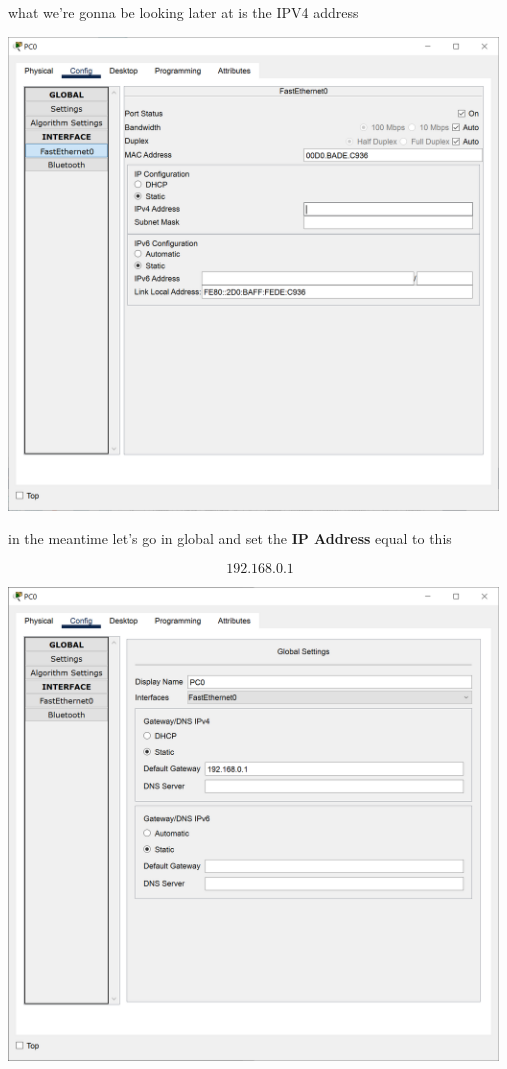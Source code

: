 \documentclass[a4paper,12pt]{article}
\begin{document}
\noindent what we're gonna be looking later at is the IPV4 address \newline

\noindent \includegraphics[width=13cm]{./step-by-step/5.PNG}
\clearpage

\noindent in the meantime let's  go in global and set the \textbf{IP Address} equal to this 

\[192.168.0.1\]

\noindent \includegraphics[width=13cm]{./step-by-step/6.PNG}
\clearpage
\end{document}
